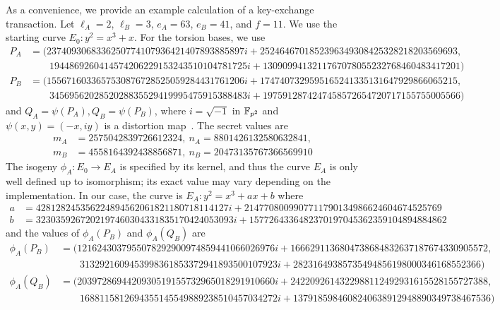 As a convenience, we provide an example calculation of a key-exchange
transaction. Let $\ell_A = 2$, $\ell_B = 3$, $e_A = 63$, $e_B = 41$,
and $f = 11$. We use the starting curve $E_0: y^2 = x^3 + x$. For the
torsion bases, we use {\tiny
\begin{align*}
P_A &= (2374093068336250774107936421407893885897 i + 
    2524646701852396349308425328218203569693, \\
    & \qquad 1944869260414574206229153243510104781725 i + 
    1309099413211767078055232768460483417201) \\
P_B &= (1556716033657530876728525059284431761206 i + 
    1747407329595165241335131647929866065215, \\
    & \qquad 3456956202852028835529419995475915388483 i + 
    1975912874247458572654720717155755005566)
\end{align*}
}
{\!\!\!} and $Q_A = \psi(P_A), Q_B = \psi(P_B)$, where $i = \sqrt{-1}$ in
${\mathbb{F}}_{p^2}$ and $\psi(x,y) = (-x,iy)$ is a distortion map~\cite{joux}. The
secret values are
{\tiny
\begin{align*}
m_A &= 2575042839726612324,\ 
n_A = 8801426132580632841,\  \\
m_B &= 4558164392438856871,\ 
n_B = 20473135767366569910 
\end{align*}
}
The isogeny $\phi_A\colon E_0 \to E_A$ is specified by its kernel, and
thus the curve $E_A$ is only well defined up to isomorphism; its exact
value may vary depending on the implementation. In our case, the curve
is $E_A: y^2 = x^3 + ax + b$ where
{\tiny
\begin{align*}
a &= 428128245356224894562061821180718114127 i + 2147708009907711790134986624604674525769 \\
b &= 3230359267202197460304331835170424053093 i + 1577264336482370197045362359104894884862
\end{align*}
}
and the values of $\phi_A(P_B)$ and $\phi_A(Q_B)$ are
{\tiny
\begin{align*}
\phi_A(P_B) &= 
(1216243037955078292900974859441066026976 i + 
    1666291136804738684832637187674330905572, \\
    & \qquad 3132921609453998361853372941893500107923 i + 
    28231649385735494856198000346168552366)
\\
\phi_A(Q_B) &=
(2039728694420930519155732965018291910660 i + 
    2422092614322988112492931615528155727388, \\
    & \qquad 1688115812694355145549889238510457034272 i + 
    1379185984608240638912948890349738467536)
\end{align*}
}
